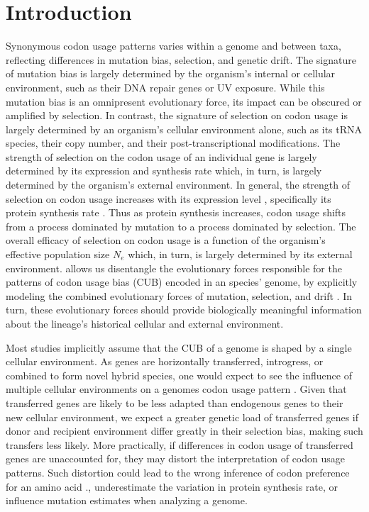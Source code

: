 \documentclass[fleqn,letterpaper]{article}
\begin{document}
\section*{Introduction}
Synonymous codon usage patterns varies within a genome and between taxa, reflecting differences in mutation bias, selection, and genetic drift.
The signature of mutation bias is largely determined by the organism's internal or cellular environment, such as their DNA repair genes or UV exposure.
While this mutation bias is an omnipresent evolutionary force, its impact can be obscured or amplified by selection. 
In contrast, the signature of selection on codon usage is largely determined by an organism's cellular environment alone, such as its tRNA species, their copy number, and their post-transcriptional modifications.
The strength of selection on the codon usage of an individual gene is largely determined by its expression and synthesis rate which, in turn, is largely determined by the organism's external environment.
In general, the strength of selection on codon usage increases with its expression level \citep{gouy1982, ikemura1985, bulmer1990}, specifically its protein synthesis rate \citep{gilchrist2007}.
Thus as protein synthesis increases, codon usage shifts from a process dominated by mutation to a process dominated by selection.
The overall efficacy of selection on codon usage is a function of the organism's effective population size $N_e$ which, in turn, is largely determined by its external environment.
\ROC allows us disentangle the evolutionary forces responsible for the patterns of codon usage bias (CUB) encoded in an species' genome, by explicitly modeling the combined evolutionary forces of mutation, selection, and drift \citep{gilchrist2007, ShahAndGilchrist2011, wallace2013, gilchrist2015}.
In turn, these evolutionary forces should provide biologically meaningful information about the lineage's historical cellular and external environment.

Most studies implicitly assume that the CUB of a genome is shaped by a single cellular environment. 
As genes are horizontally transferred, introgress, or combined to form novel hybrid species, one would expect to see the influence of multiple cellular environments on a genomes codon usage pattern \citep{medigue1991, lawrence1997}.
Given that transferred genes are likely to be less adapted than endogenous genes to their new cellular environment, we expect a greater genetic load of transferred genes if donor and recipient environment differ greatly in their selection bias, making such transfers less likely.
More practically, if differences in codon usage of transferred genes are unaccounted for, they may distort the interpretation of codon usage patterns.
Such distortion could lead to the wrong inference of codon preference for an amino acid \citep{ShahAndGilchrist2011, gilchrist2015}., underestimate the variation in protein synthesis rate, or influence mutation estimates when analyzing a genome.
\end{document}
